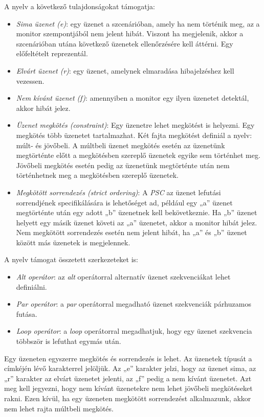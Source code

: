 A nyelv a következő tulajdonságokat támogatja:
\begin{itemize}
    \item \textit{Sima üzenet (e)}: egy üzenet a szcenárióban, amely ha nem történik meg, az a monitor szempontjából nem jelent hibát.
    Viszont ha megjelenik, akkor a szcenárióban utána következő üzenetek ellenőrzésére kell áttérni.
    Egy előfeltételt reprezentál.
    \item \textit{Elvárt üzenet (r)}: egy üzenet, amelynek elmaradása hibajelzéshez kell vezessen.
    \item \textit{Nem kívánt üzenet (f)}: amennyiben a monitor egy ilyen üzenetet detektál, akkor hibát jelez.
    \item \textit{Üzenet megkötés (constraint)}: Egy üzenetre lehet megkötést is helyezni.
    Egy megkötés több üzenetet tartalmazhat.
    Két fajta megkötést definiál a nyelv: múlt- és jövőbeli.
    A múltbeli üzenet megkötés esetén az üzenetünk megtörténte előtt a megkötésben szereplő üzenetek egyike sem történhet meg.
    Jövőbeli megkötés esetén pedig az üzenetünk megtörténte után nem történhetnek meg a megkötésben szereplő üzenetek.
    \item \textit{Megkötött sorrendezés (strict ordering)}: A \textit{PSC} az üzenet lefutási sorrendjének specifikálására is lehetőséget ad, például egy „a” üzenet megtörténte után egy adott „b” üzenetnek kell bekövetkeznie.
    Ha „b” üzenet helyett egy másik üzenet követi az „a” üzenetet, akkor a monitor hibát jelez.
    Nem megkötött sorrendezés esetén nem jelent hibát, ha „a” és „b” üzenet között más üzenetek is megjelennek.
\end{itemize}

A nyelv támogat összetett szerkezeteket is:

\begin{itemize}
    \item \textit{Alt operátor}: az \textit{alt} operátorral alternatív üzenet szekvenciákat lehet definiálni.
    \item \textit{Par operátor}: a \textit{par} operátorral megadható üzenet szekvenciák párhuzamos futása.
    \item \textit{Loop operátor}: a \textit{loop} operátorral megadhatjuk, hogy egy üzenet szekvencia többször is lefuthat egymás után.
\end{itemize}

Egy üzeneten egyszerre megkötés és sorrendezés is lehet.
Az üzenetek típusát a címkéjén lévő karakterrel jelöljük.
Az „e” karakter jelzi, hogy az üzenet sima, az „r” karakter az elvárt üzenetet jelenti, az „f” pedig a nem kívánt üzenetet.
Azt meg kell jegyezni, hogy nem kívánt üzenetekre nem lehet jövőbeli megkötéseket rakni.
Ezen kívül, ha egy üzeneten megkötött sorrendezést alkalmazunk, akkor nem lehet rajta múltbeli megkötés.

